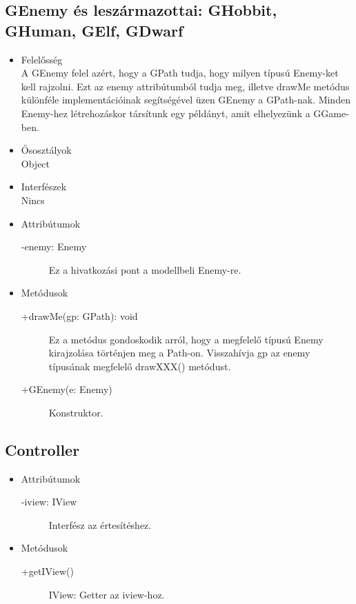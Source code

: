 \subsection{GEnemy és leszármazottai: GHobbit, GHuman, GElf, GDwarf}
\begin{itemize}
\item Felelősség\\
A GEnemy felel azért, hogy a GPath tudja, hogy milyen típusú Enemy-ket kell rajzolni. Ezt az enemy attribútumból tudja meg, illetve drawMe metódus különféle implementációinak segítségével üzen GEnemy a GPath-nak. Minden Enemy-hez létrehozáskor társítunk egy példányt, amit elhelyezünk a GGame-ben.
\item Ősosztályok\\
Object
\item Interfészek\\
Nincs
\item Attribútumok\\
	\begin{description}
		\item[-enemy: Enemy] Ez a hivatkozási pont a modellbeli Enemy-re.
\end{description}
\item Metódusok\\
	\begin{description}
		\item[+drawMe(gp: GPath): void] Ez a metódus gondoskodik arról, hogy a megfelelő típusú Enemy kirajzolása történjen meg a Path-on. Visszahívja gp az enemy típusának megfelelő drawXXX() metódust.
		\item[+GEnemy(e: Enemy)] Konstruktor.
	\end{description}
\end{itemize}

\subsection{Controller}
\begin{itemize}
\item Attribútumok\\
	\begin{description}
		\item[-iview: IView] Interfész az értesítéshez.
\end{description}
\item Metódusok\\
	\begin{description}
		\item[+getIView()] IView: Getter az iview-hoz.
	\end{description}
\end{itemize}

